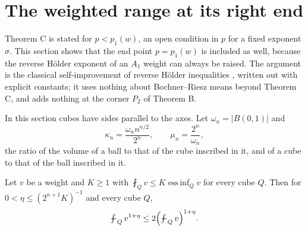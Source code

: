 \section{The weighted range at its right end}\label{sec:boundary}

Theorem C is stated for $p<p_1(w)$, an open condition in $p$ for a fixed exponent $\sigma$. This
section shows that the end point $p=p_1(w)$ is included as well, because the reverse H\"older
exponent of an $A_1$ weight can always be raised. The argument is the classical self-improvement
of reverse H\"older inequalities \cite{CF74}, written out with explicit constants; it uses
nothing about Bochner--Riesz means beyond Theorem C, and adds nothing at the corner $P_2$ of
Theorem B.

In this section cubes have sides parallel to the axes. Let $\omega_n=|B(0,1)|$ and
\[
\kappa_n=\frac{\omega_n n^{n/2}}{2^n},\qquad \mu_n=\frac{2^n}{\omega_n},
\]
the ratio of the volume of a ball to that of the cube inscribed in it, and of a cube to that of
the ball inscribed in it.

\begin{lemma}\label{lem:gehring}
Let $v$ be a weight and $K\ge1$ with $\fint_Qv\le K\operatorname*{ess\,inf}_Qv$ for every cube $Q$. Then
for $0<\eta\le(2^{n+1}K)^{-1}$ and every cube $Q$,
\[
\fint_Qv^{1+\eta}\le2\Bigl(\fint_Qv\Bigr)^{1+\eta}.
\]
\end{lemma}

